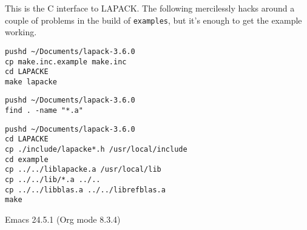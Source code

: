 \documentclass[10pt,oneside,x11names]{article}
\begin{document}
This is the C interface to LAPACK.  The following mercilessly hacks around a couple of
problems in the build of \texttt{examples}, but it's enough to get the example working.

\begin{verbatim}
pushd ~/Documents/lapack-3.6.0
cp make.inc.example make.inc
cd LAPACKE
make lapacke
\end{verbatim}

\begin{verbatim}
pushd ~/Documents/lapack-3.6.0
find . -name "*.a"
\end{verbatim}

\begin{verbatim}
pushd ~/Documents/lapack-3.6.0
cd LAPACKE
cp ./include/lapacke*.h /usr/local/include
cd example
cp ../../liblapacke.a /usr/local/lib
cp ../../lib/*.a ../..
cp ../../libblas.a ../../librefblas.a
make
\end{verbatim}
Emacs 24.5.1 (Org mode 8.3.4)
\end{document}
